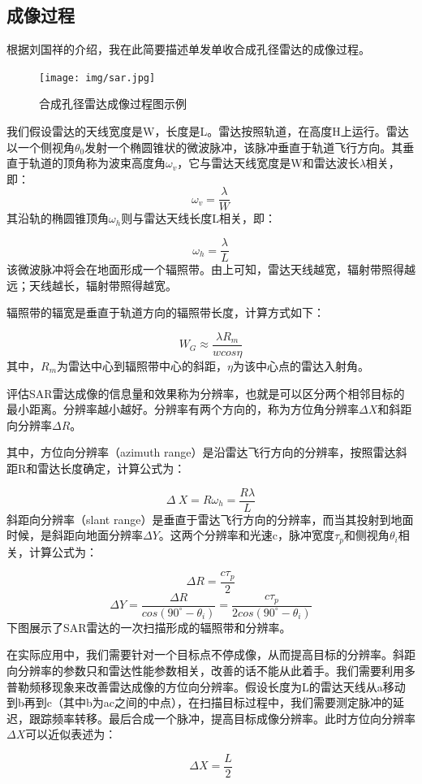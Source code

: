\documentclass{xduugthesis}
\begin{document}
\subsection{成像过程}
根据刘国祥的介绍\cite{SAR_Process}，我在此简要描述单发单收合成孔径雷达的成像过程。\par
\begin{figure}[h!]
	\centering
	\texttt{[image: img/sar.jpg]}
	\caption{合成孔径雷达成像过程图示例}
\end{figure}
我们假设雷达的天线宽度是W，长度是L。雷达按照轨道，在高度H上运行。雷达以一个侧视角$\theta_0$发射一个椭圆锥状的微波脉冲，该脉冲垂直于轨道飞行方向。其垂直于轨道的顶角称为波束高度角$\omega_v$，它与雷达天线宽度是W和雷达波长$\lambda$相关，即：
$$\omega_v=\frac{\lambda}{W}$$
其沿轨的椭圆锥顶角$\omega_h$则与雷达天线长度L相关，即：\par
$$\omega_h=\frac{\lambda}{L}$$
该微波脉冲将会在地面形成一个辐照带。由上可知，雷达天线越宽，辐射带照得越远；天线越长，辐射带照得越宽。\par
辐照带的辐宽是垂直于轨道方向的辐照带长度，计算方式如下：\par
$$W_G\approx\frac{{\lambda}R_m}{wcos\eta}$$
其中，$R_m$为雷达中心到辐照带中心的斜距，$\eta$为该中心点的雷达入射角。\par
评估SAR雷达成像的信息量和效果称为分辨率，也就是可以区分两个相邻目标的最小距离。分辨率越小越好。分辨率有两个方向的，称为方位角分辨率$\Delta X$和斜距向分辨率$\Delta R$。\par
其中，方位向分辨率（azimuth range）是沿雷达飞行方向的分辨率，按照雷达斜距R和雷达长度确定，计算公式为：\par
$$\Delta\ X=R\omega_h=\frac{R\lambda}{L}$$
斜距向分辨率（slant range）是垂直于雷达飞行方向的分辨率，而当其投射到地面时候，是斜距向地面分辨率$\Delta Y$。这两个分辨率和光速c，脉冲宽度$\tau_p$和侧视角$\theta_i$相关，计算公式为：\par
$$\Delta R=\frac{c\tau_p}{2}$$
$$\Delta Y=\frac{\Delta R}{cos(90^\circ-\theta_i)}=\frac{c\tau_p}{2cos(90^\circ-\theta_i)}$$
下图展示了SAR雷达的一次扫描形成的辐照带和分辨率。\par
在实际应用中，我们需要针对一个目标点不停成像，从而提高目标的分辨率。斜距向分辨率的参数只和雷达性能参数相关，改善的话不能从此着手。我们需要利用多普勒频移现象来改善雷达成像的方位向分辨率。假设长度为L的雷达天线从a移动到b再到c（其中b为ac之间的中点），在扫描目标过程中，我们需要测定脉冲的延迟，跟踪频率转移。最后合成一个脉冲，提高目标成像分辨率。此时方位向分辨率$\Delta X$可以近似表述为：\par
$$\Delta X=\frac{L}{2}$$
\end{document}
